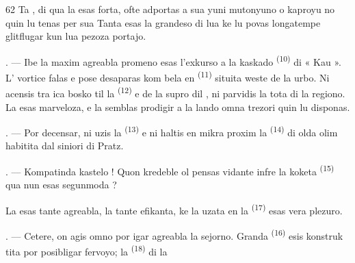 \begin{VUpage}[64]{62}
\VUblancAlinea
Ta , di qua la  esas forta,\nl
ofte adportas a sua yuni mutonyuno o kaproyu\cc
no quin lu tenas per sua  Tanta esas la\nl
grandeso di lua  ke lu povas longatempe\nl
glitflugar kun lua pezoza portajo.

\VUsaut{3.0mm}
\VUsaut{3.0mm}

. --- Ibe la maxim agreabla promeno esas\nl
l'exkurso a la kaskado \textsuperscript{(10)} di « Kau ». L'\cc
{} vortice falas e pose desaparas kom bela\nl
{} en  \textsuperscript{(11)} situita weste\nl
de la urbo. Ni acensis tra ica bosko til la \cc
{} \textsuperscript{(12)} e de la supro dil\nl
{}, ni parvidis la tota  di la\nl
regiono. La  esas marveloza, e la \cc
{} semblas prodigir a la lando omna trezori\nl
quin lu disponas.

. --- Por decensar, ni uzis la  \textsuperscript{(13)}\nl
e ni haltis en mikra  proxim la \cc
{} \textsuperscript{(14)} di olda  olim habitita\nl
dal siniori di Pratz.

. --- Kompatinda kastelo ! Quon kredeble ol\nl
pensas vidante infre la koketa  \textsuperscript{(15)}\nl
qua nun esas  segunmoda ?

\VUblancAlinea
La  esas tante agreabla, la \nl
{} tante efikanta, ke la  uzata en la\nl
{} \textsuperscript{(17)} esas vera plezuro.

\VUsaut{3.0mm}
\VUsaut{3.0mm}

. --- Cetere, on agis omno por igar agreabla\nl
la sejorno. Granda  \textsuperscript{(16)} esis konstruk\cc
tita por posibligar fervoyo; la  \textsuperscript{(18)} di la
\parplein
\end{VUpage}

